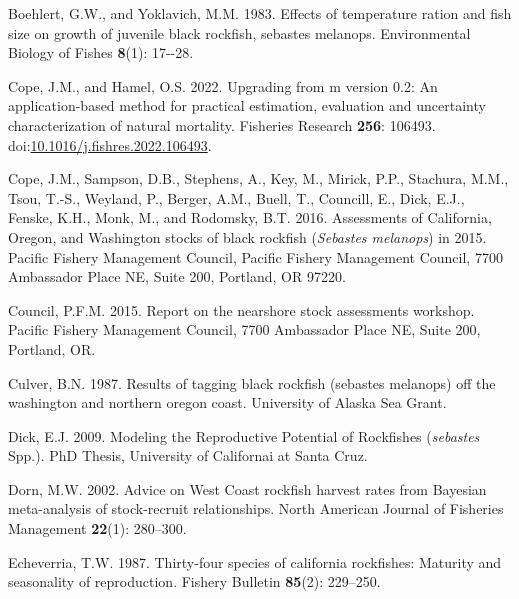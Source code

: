 \documentclass[11pt,
  english,
  letterpaper,
]{article}
\newlength{\cslhangindent}
\newenvironment{CSLReferences}[2] %
 {%
  \setlength{\parindent}{0pt}
  \ifodd #1 \everypar{\setlength{\hangindent}{\cslhangindent}}\ignorespaces\fi
  \ifnum #2 > 0
  \setlength{\parskip}{#2\baselineskip}
  \fi
 }%
 {}
\begin{document}
\begin{CSLReferences}{1}{0}
\leavevmode{}%
Boehlert, G.W., and Yoklavich, M.M. 1983. Effects of temperature ration and fish size on growth of juvenile black rockfish, sebastes melanops. Environmental Biology of Fishes \textbf{8}(1): 17-\/-28.

\leavevmode{}%
Cope, J.M., and Hamel, O.S. 2022. Upgrading from m version 0.2: An application-based method for practical estimation, evaluation and uncertainty characterization of natural mortality. Fisheries Research \textbf{256}: 106493. doi:\href{https://doi.org/10.1016/j.fishres.2022.106493}{10.1016/j.fishres.2022.106493}.

\leavevmode{}%
Cope, J.M., Sampson, D.B., Stephens, A., Key, M., Mirick, P.P., Stachura, M.M., Tsou, T.-S., Weyland, P., Berger, A.M., Buell, T., Councill, E., Dick, E.J., Fenske, K.H., Monk, M., and Rodomsky, B.T. 2016. Assessments of {California}, {Oregon}, and {Washington} stocks of black rockfish (\emph{{Sebastes} melanops}) in 2015. Pacific Fishery Management Council, Pacific Fishery Management Council, 7700 Ambassador Place NE, Suite 200, Portland, OR 97220.

\leavevmode{}%
Council, P.F.M. 2015. Report on the nearshore stock assessments workshop. Pacific Fishery Management Council, 7700 Ambassador Place NE, Suite 200, Portland, OR.

\leavevmode{}%
Culver, B.N. 1987. Results of tagging black rockfish (sebastes melanops) off the washington and northern oregon coast. University of Alaska Sea Grant.

\leavevmode{}%
Dick, E.J. 2009. Modeling the {Reproductive} {Potential} of {Rockfishes} (\emph{sebastes} {Spp}.). PhD Thesis, University of Californai at Santa Cruz.

\leavevmode{}%
Dorn, M.W. 2002. Advice on {West} {Coast} rockfish harvest rates from {B}ayesian meta-analysis of stock-recruit relationships. North American Journal of Fisheries Management \textbf{22}(1): 280--300.

\leavevmode{}%
Echeverria, T.W. 1987. Thirty-four species of california rockfishes: Maturity and seasonality of reproduction. Fishery Bulletin \textbf{85}(2): 229--250.


\end{CSLReferences}
\end{document}
